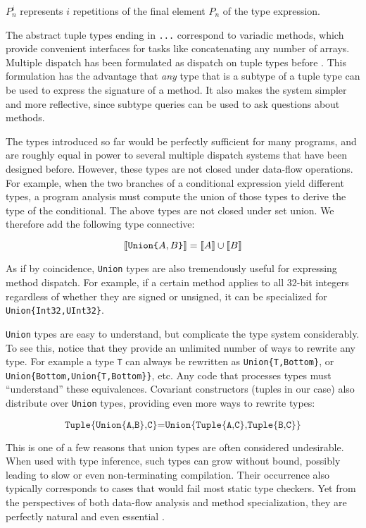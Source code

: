 \noindent
$P_n^i$ represents $i$ repetitions of the final element $P_n$ of the type expression.

The abstract tuple types ending in \texttt{...} correspond to variadic methods, which
provide convenient interfaces for tasks like concatenating any number of arrays.
Multiple dispatch has been formulated as dispatch on tuple types before \cite{Leavens1998}.
This formulation has the advantage that \emph{any} type that is a subtype of a
tuple type can be used to express the signature of a method. It also makes the system
simpler and more reflective, since subtype queries can be used to ask questions about
methods.

The types introduced so far would be perfectly sufficient for many programs, and are
roughly equal in power to several multiple dispatch systems that have been designed
before. However, these types are not closed under data-flow operations. For example,
when the two branches of a conditional expression yield different types, a program
analysis must compute the union of those types to derive the type of the conditional.
The above types are not closed under set union. We therefore add the following
type connective:

\vspace{-3ex}
\[
  \llbracket \texttt{Union\{}A,B\texttt{\}} \rrbracket = \llbracket A \rrbracket \cup \llbracket B \rrbracket \\
\]

As if by coincidence, \texttt{Union} types are also tremendously useful for expressing
method dispatch. For example, if a certain method applies to all 32-bit integers regardless
of whether they are signed or unsigned, it can be specialized for \texttt{Union\{Int32,UInt32\}}.

\texttt{Union} types are easy to understand, but complicate the type system considerably.
To see this, notice that they provide an unlimited number of ways to rewrite any type.
For example a type \texttt{T} can always be rewritten as \texttt{Union\{T,Bottom\}}, or
\texttt{Union\{Bottom,Union\{T,Bottom\}\}}, etc. Any code that processes types must
``understand'' these equivalences. Covariant constructors (tuples in our case)
also distribute over \texttt{Union} types, providing even more ways to rewrite types:

\vspace{-3ex}
\[
\texttt{Tuple\{Union\{A,B\},C\}} = \texttt{Union\{Tuple\{A,C\},Tuple\{B,C\}\}}
\]

This is one of a few reasons that union types are often considered undesirable.
When used with type inference, such types can grow without bound, possibly leading
to slow or even non-terminating compilation. Their occurrence also typically
corresponds to cases that would fail most static type checkers. Yet from the
perspectives of both data-flow analysis and method specialization, they are
perfectly natural and even essential \cite{abstractinterp}
\cite{Igarashi} \cite{Smith:2008:JTI:1449764.1449804}.

